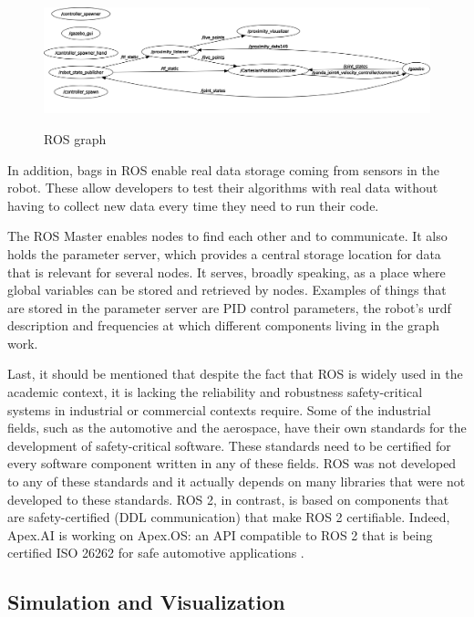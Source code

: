 \begin{figure}[H]
    \caption[ROS graph]{
        ROS graph
    }
    \centering
    \includegraphics[width=\textwidth]{figs/rosgraph.png}
    \label{fig:rosgraph}
\end{figure}

In addition, bags in ROS enable real data storage coming from sensors in the robot. These allow developers to test their algorithms with real data without having to collect new data every time they need to run their code.

The ROS Master enables nodes to find each other and to communicate. It also holds the parameter server, which provides a central storage location for data that is relevant for several nodes. It serves, broadly speaking, as a place where global variables can be stored and retrieved by nodes. Examples of things that are stored in the parameter server are PID control parameters, the robot’s urdf description and frequencies at which different components living in the graph work.

Last, it should be mentioned that despite the fact that ROS is widely used in the academic context, it is lacking the reliability and robustness safety-critical systems in industrial or commercial contexts require. Some of the industrial fields, such as the automotive and the aerospace, have their own standards for the development of safety-critical software. These standards need to be certified for every software component written in any of these fields. ROS was not developed to any of these standards and it actually depends on many libraries that were not developed to these standards. ROS 2, in contrast, is based on components that are safety-certified (DDL communication) that make ROS 2 certifiable. Indeed, Apex.AI is working on Apex.OS: an API compatible to ROS 2 that is being certified ISO 26262 for safe automotive applications \cite{apexOS}.


\subsection{Simulation and Visualization}

